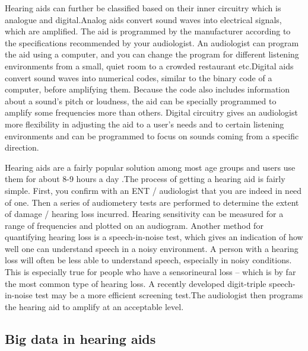 \documentclass[sigconf]{acmart}
\begin{document}
Hearing aids can further be classified based on their inner circuitry which is analogue and digital.Analog aids convert sound waves into electrical signals, which are amplified. The aid is programmed by the manufacturer according to the specifications recommended by your audiologist. An audiologist can program the aid using a computer, and you can change the program for different listening environments from a small, quiet room to a crowded restaurant etc.Digital aids convert sound waves into numerical codes, similar to the binary code of a computer, before amplifying them. Because the code also includes information about a sound’s pitch or loudness, the aid can be specially programmed to amplify some frequencies more than others. Digital circuitry gives an audiologist more flexibility in adjusting the aid to a user’s needs and to certain listening environments and can be programmed to focus on sounds coming from a specific direction\cite{NIHCD2017}.

Hearing aids are a fairly popular solution among most age groups and users use them for about 8-9 hours a day \cite{Audiol.2017}.The process of getting a hearing aid is fairly simple. First, you confirm with an ENT / audiologist that you are indeed in need of one. Then a series of audiometery tests are performed to determine the extent of damage / hearing loss incurred. Hearing sensitivity can be measured for a range of frequencies and plotted on an audiogram. Another method for quantifying hearing loss is a speech-in-noise test, which gives an indication of how well one can understand speech in a noisy environment. A person with a hearing loss will often be less able to understand speech, especially in noisy conditions. This is especially true for people who have a sensorineural loss – which is by far the most common type of hearing loss.  A recently developed digit-triple speech-in-noise test may be a more efficient screening test.The audiologist then programs the hearing aid to amplify at an acceptable level.


\subsection{Big data in hearing aids}
\end{document}
